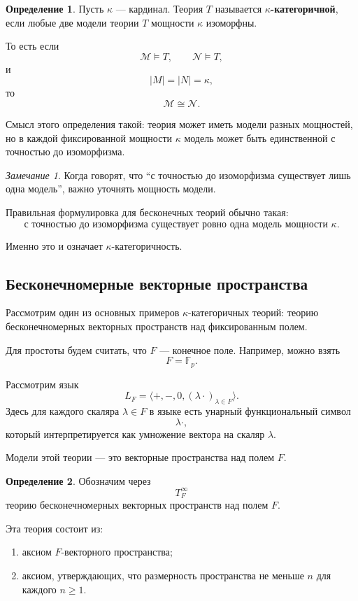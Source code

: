 \documentclass[12pt,a4paper,oneside,openany]{book}
\theoremstyle{definition}
\newtheorem{definition}{Определение}[chapter]
\theoremstyle{plain}
\theoremstyle{remark}
\newtheorem{remark}{Замечание}[chapter]
\begin{document}
\begin{definition}
Пусть $\kappa$ — кардинал. Теория $T$ называется \textbf{$\kappa$-категоричной}, если любые две модели теории $T$ мощности $\kappa$ изоморфны.

То есть если
\[
\mathcal M\models T,
\qquad
\mathcal N\models T,
\]
и
\[
|M|=|N|=\kappa,
\]
то
\[
\mathcal M\cong\mathcal N.
\]
\end{definition}

Смысл этого определения такой: теория может иметь модели разных мощностей, но в каждой фиксированной мощности $\kappa$ модель может быть единственной с точностью до изоморфизма.

\begin{remark}
Когда говорят, что ``с точностью до изоморфизма существует лишь одна модель'', важно уточнять мощность модели.

Правильная формулировка для бесконечных теорий обычно такая:
\[
\text{с точностью до изоморфизма существует ровно одна модель мощности }\kappa.
\]

Именно это и означает $\kappa$-категоричность.
\end{remark}

\subsection{Бесконечномерные векторные пространства}

Рассмотрим один из основных примеров $\kappa$-категоричных теорий: теорию бесконечномерных векторных пространств над фиксированным полем.

Для простоты будем считать, что $F$ — конечное поле. Например, можно взять
\[
F=\mathbb F_p.
\]

Рассмотрим язык
\[
L_F=\langle +,-,0,(\lambda\cdot)_{\lambda\in F}\rangle.
\]
Здесь для каждого скаляра $\lambda\in F$ в языке есть унарный функциональный символ
\[
\lambda\cdot,
\]
который интерпретируется как умножение вектора на скаляр $\lambda$.

Модели этой теории — это векторные пространства над полем $F$.

\begin{definition}
Обозначим через
\[
T_F^\infty
\]
теорию бесконечномерных векторных пространств над полем $F$.
\end{definition}

Эта теория состоит из:
\begin{enumerate}
    \item аксиом $F$-векторного пространства;
    \item аксиом, утверждающих, что размерность пространства не меньше $n$ для каждого $n\ge 1$.
\end{enumerate}
\end{document}
